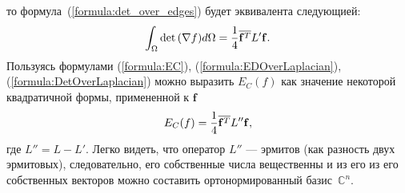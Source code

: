 то формула~(\ref{formula:det_over_edges}) будет эквивалента следующией:
\begin{equation}
\label{formula:DetOverLaplacian}
  \int_{\Omega} \det {\left( \nabla f \right) } d\Omega = \frac{1}{4} \overline{\mathbf{f}^T} L' \mathbf{f}.
\end{equation}
Пользуясь формулами (\ref{formula:EC}), (\ref{formula:EDOverLaplacian}), 
(\ref{formula:DetOverLaplacian}) можно выразить $E_C(f)$ как значение некоторой квадратичной 
формы, примененной к $\mathbf{f}$
\begin{equation*}
  E_C(f) = \frac{1}{4}\overline{\mathbf{f}^T} L'' \mathbf{f},
\end{equation*}
где $L'' = L - L'$. Легко видеть, что оператор $L''$ --- эрмитов (как разность двух эрмитовых), 
следовательно, его собственные числа вещественны и из его из его собственных векторов можно составить 
ортонормированный базис~$\mathbb{C}^n$.
